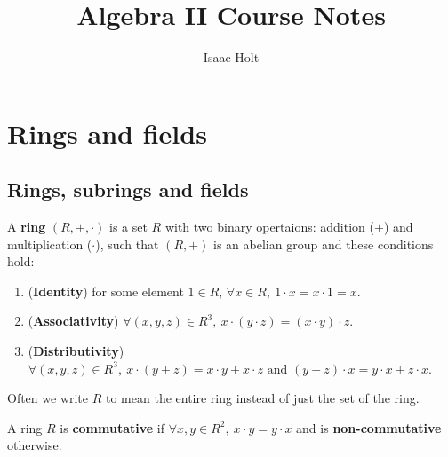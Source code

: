 

\title{Algebra II Course Notes}
\author{Isaac Holt}





\newcommand{\ord}{\text{ord}}
\newcommand{\Stab}{\text{Stab}}
\newcommand{\ccl}{\text{ccl}}
\newcommand{\End}{\text{End}}

\section{Rings and fields}

\subsection{Rings, subrings and fields}

\begin{definition}
	A \textbf{ring} $(R, +, \cdot)$ is a set $R$ with two binary opertaions: addition ($+$) and multiplication ($\cdot$), such that $(R, +)$ is an abelian group and these conditions hold:
	\begin{enumerate}
		\item (\textbf{Identity}) for some element $1 \in R$, $\forall x \in R, \ 1 \cdot x = x \cdot 1 = x$.
		\item (\textbf{Associativity}) $\forall (x, y, z) \in R^3, \ x \cdot (y \cdot z) = (x \cdot y) \cdot z$.
		\item (\textbf{Distributivity}) $\forall (x, y, z) \in R^3, \ x \cdot (y + z) = x \cdot y + x \cdot z \text{ and } (y + z) \cdot x = y \cdot x + z \cdot x$. 
	\end{enumerate}
\end{definition}

\begin{remark}
	Often we write $R$ to mean the entire ring instead of just the set of the ring.
\end{remark}

\begin{definition}
	A ring $R$ is \textbf{commutative} if $\forall x, y \in R^2, \ x \cdot y = y \cdot x$ and is \textbf{non-commutative} otherwise.
\end{definition}

